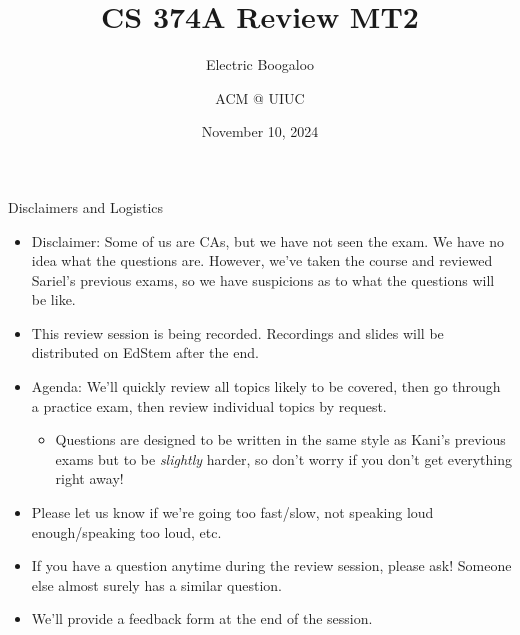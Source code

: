 \documentclass{beamer}
\title[ACM fun]{CS 374A Review MT2}
\subtitle{Electric Boogaloo}
\author{ACM @ UIUC}
\date{November 10, 2024}
\begin{document}
\begin{frame}
  \titlepage
\end{frame}

\begin{frame}[t]{Disclaimers and Logistics}
  \begin{itemize}
  \item \alert{Disclaimer:} Some of us are CAs, but we have not seen the exam. We have no idea what the questions are. However, we've taken the course and reviewed Sariel's previous exams, so we have \alert{suspicions} as to what the questions will be like.
  \item This review session is being recorded. Recordings and slides will be distributed on EdStem after the end.
  \item \alert{Agenda:} We'll quickly review all topics likely to be covered, then go through a practice exam, then review individual topics by request.
  \begin{itemize}
      \item Questions are designed to be written in the same style as Kani's previous exams but to be \textit{slightly} harder, so don't worry if you don't get everything right away!
  \end{itemize}
  \item Please let us know if we're going too fast/slow, not speaking loud enough/speaking too loud, etc.
  \item If you have a question anytime during the review session, please ask! Someone else almost surely has a similar question.
  \item We'll provide a feedback form at the end of the session.
  \end{itemize}
\end{frame}
\end{document}
